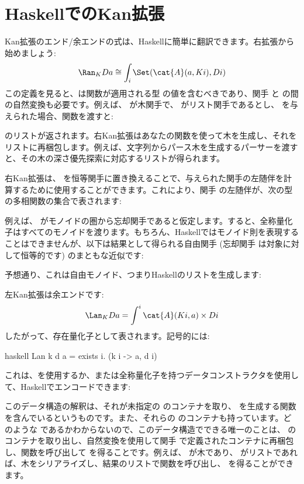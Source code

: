 \section{HaskellでのKan拡張}

Kan拡張のエンド/余エンドの式は、Haskellに簡単に翻訳できます。右拡張から始めましょう:
\[\Ran_{K}D a \cong \int_i \Set(\cat{A}(a, K i), D i)\]
この定義を見ると、は関数が適用される型  の値を含むべきであり、関手  と  の間の自然変換も必要です。例えば、 が木関手で、 がリスト関手であるとし、 を与えられた場合、関数を渡すと:

 のリストが返されます。右Kan拡張はあなたの関数を使って木を生成し、それをリストに再梱包します。例えば、文字列からパース木を生成するパーサーを渡すと、その木の深さ優先探索に対応するリストが得られます。

右Kan拡張は、 を恒等関手に置き換えることで、与えられた関手の左随伴を計算するために使用することができます。これにより、関手  の左随伴が、次の型の多相関数の集合で表されます:

例えば、 がモノイドの圏から忘却関手であると仮定します。すると、全称量化子はすべてのモノイドを渡ります。もちろん、Haskellではモノイド則を表現することはできませんが、以下は結果として得られる自由関手 (忘却関手  は対象に対して恒等的です) のまともな近似です:

予想通り、これは自由モノイド、つまりHaskellのリストを生成します:

左Kan拡張は余エンドです:
\[\Lan_{K}D a = \int^i \cat{A}(K i, a)\times{}D i\]
したがって、存在量化子として表されます。記号的には:

\begin{snip}{haskell}
Lan k d a = exists i. (k i -> a, d i)
\end{snip}
これは、を使用するか、または全称量化子を持つデータコンストラクタを使用して、Haskellでエンコードできます:

このデータ構造の解釈は、それが未指定の  のコンテナを取り、 を生成する関数を含んでいるというものです。また、それらの  のコンテナも持っています。どのような  であるかわからないので、このデータ構造でできる唯一のことは、 のコンテナを取り出し、自然変換を使用して関手  で定義されたコンテナに再梱包し、関数を呼び出して  を得ることです。例えば、 が木であり、 がリストであれば、木をシリアライズし、結果のリストで関数を呼び出し、 を得ることができます。

